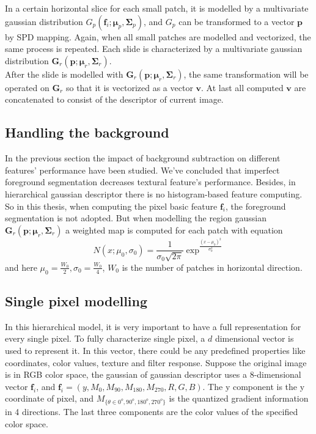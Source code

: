 In a certain horizontal slice for each small patch, it is modelled by a multivariate gaussian distribution $G_p(\bm{f}_i;\bm{\mu}_p,\bm{\Sigma}_p)$, and $G_p$ can be transformed to a vector $\bm{p}$ by SPD mapping. Again, when all small patches are modelled and vectorized, the same process is repeated. Each slide is characterized by a multivariate gaussian distribution $\bm{G}_r(\bm{p};\bm{\mu}_r,\bm{\Sigma}_r)$.\\
\indent After the slide is modelled with $\bm{G}_r(\bm{p};\bm{\mu}_r,\bm{\Sigma}_r)$, the same transformation will be operated on $\bm{G}_r$ so that it is vectorized as a vector $\bm{v}$. At last all computed $\bm{v}$ are concatenated to consist of the descriptor of current image. 

\subsection{Handling the background}
In the previous section the impact of background subtraction on different features' performance have been studied. We've concluded that imperfect foreground segmentation decreases textural feature's performance. Besides, in hierarchical gaussian descriptor there is no histogram-based feature computing. So in this thesis, when computing the pixel basic feature $\bm{f}_i$, the foreground segmentation is not adopted. But when modelling the region gaussian $\bm{G}_r(\bm{p};\bm{\mu}_r,\bm{\Sigma}_r)$ a weighted map is computed for each patch with equation
\begin{equation} 
N(x;\mu_0,\sigma_0) = \frac{1}{\sigma_0\sqrt{2\pi}} \exp^{\frac{(x - \mu_0)^2}{\sigma_0^2}}
\end{equation}
and here $\mu_0 = \frac{W_0}{2}, \sigma_0 = \frac{W_0}{4}$, $W_0$ is the number of patches in horizontal direction.
\subsection{Single pixel modelling}

In this hierarchical model, it is very important to have a full representation for every single pixel. To fully characterize single pixel, a $d$ dimensional vector is used to represent it. In this vector, there could be any predefined properties like coordinates, color values, texture and filter response. Suppose the original image is in RGB color space, the gaussian of gaussian descriptor uses a 8-dimensional vector $\bm{f}_i$, and 
$\bm{f}_i = (y,M_0,M_{90},M_{180},M_{270},R,G,B)$.
The y component is the y coordinate of pixel, and $M_{\{{\theta}\in{0^o,90^o,180^o,270^o}\}}$ is the quantized gradient information in 4 directions. The last three components are the color values of the specified color space.

